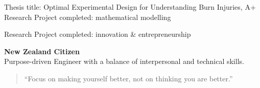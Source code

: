 \documentclass[10pt,a4paper,ragged2e,withhyper]{altacv}
\begin{document}
\begin{paracol}{2}
\medskip


Thesis title: Optimal Experimental Design for Understanding Burn Injuries, A+\\
Research Project completed: mathematical modelling

\divider

Research Project completed: innovation \& entrepreneurship









\switchcolumn

\textbf{New Zealand Citizen}\\
Purpose-driven Engineer with a balance of interpersonal and technical skills.

\medskip


\begin{quote}
``Focus on making yourself better, not on thinking you are better.''
\end{quote}

\medskip


\\
\\
\\
\\



\end{paracol}
\end{document}
